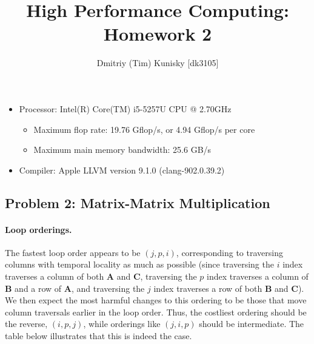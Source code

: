 \documentclass[11pt]{article}
\title{High Performance Computing: Homework 2}
\author{Dmitriy (Tim) Kunisky [dk3105]}
\date{}
\theoremstyle{plain} %
\begin{document}
\maketitle

\begin{itemize}
\item Processor: Intel(R) Core(TM) i5-5257U CPU @ 2.70GHz
    \begin{itemize}
    \item Maximum flop rate: 19.76 Gflop/s, or 4.94 Gflop/s per core
    \item Maximum main memory bandwidth: 25.6 GB/s
    \end{itemize}
\item Compiler: Apple LLVM version 9.1.0 (clang-902.0.39.2)
\end{itemize}

\subsection*{Problem 2: Matrix-Matrix Multiplication}

\paragraph{Loop orderings.}
The fastest loop order appears to be $(j, p, i)$, corresponding
to traversing columns with temporal locality as much as possible (since traversing
the $i$ index traverses a column of both $\bm A$ and $\bm C$, traversing the
$p$ index traverses a column of $\bm B$ and a row of $\bm A$, and traversing the
$j$ index traverses a row of both $\bm B$ and $\bm C$).
We then expect the most harmful changes to this ordering to be those that move
column traversals earlier in the loop order.
Thus, the costliest ordering should be the reverse, $(i, p, j)$, while orderings
like $(j, i, p)$ should be intermediate.
The table below illustrates that this is indeed the case.
\end{document}
